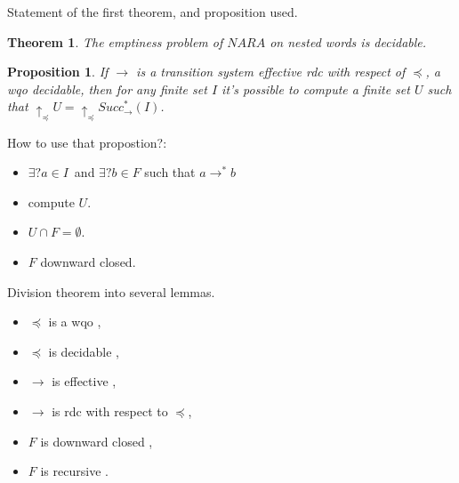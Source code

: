 \documentclass{beamer}
\newtheorem{thr}{Theorem} %
\newtheorem{pp}{Proposition}
\begin{document}
\begin{frame}{Statement of the first theorem, and proposition used.}
\begin{thr}
The emptiness problem of $NARA$ on nested words is decidable.
\end{thr}
  \pause
 \begin{pp} 
   If  $\rightarrow$ is a transition system effective rdc with respect of $\preceq$, a wqo decidable, then for any finite set $I$ it's possible to compute a finite set $U$ such that
   $\uparrow_\preceq U=\uparrow_\preceq Succ^*_\rightarrow (I)$.
 \end{pp}
\pause
How to use that propostion?:
\begin{itemize}
\pause
 \item $\exists ? a \in I$\ and $\exists ? b \in F$ such that $ a \rightarrow^* b $ \pause
 \item compute $U$. \pause
 \item $U \cap F = \emptyset$. \pause
 \item $F$ downward closed.
\end{itemize}


\end{frame}


\begin{frame}{Division theorem into several lemmas.}
 \begin{itemize}
 \item $\preceq$ is a wqo ,
 	\item $\preceq$ is decidable ,
 	\item $\rightarrow$ is effective ,
	\item $\rightarrow$ is rdc with respect to $\preceq$,
 	\item $F$ is downward closed ,
 	\item $F$ is recursive .
  \end{itemize}
\end{frame}
\end{document}
